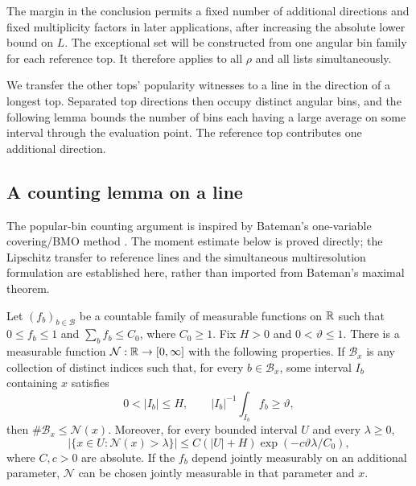 The margin in the conclusion permits a fixed number of additional
directions and fixed multiplicity factors in later applications, after
increasing the absolute lower bound on $L$.  The exceptional set will
be constructed from one angular bin family for each reference top.
It therefore applies to all $\rho$ and all lists simultaneously.

We transfer the other tops' popularity witnesses to a line in the direction
of a longest top.  Separated top directions then occupy distinct angular
bins, and the following lemma bounds the number of bins each having a
large average on some interval through the evaluation point.
The reference top contributes one additional direction.

\subsection{A counting lemma on a line}

The popular-bin counting argument is inspired by Bateman's one-variable
covering/BMO method \cite[Section~3.3.2, Lemmas~5--6]{Bateman2008Maximal}.
The moment estimate below is proved directly; the Lipschitz transfer to
reference lines and the simultaneous multiresolution formulation are
established here, rather than imported from Bateman's maximal theorem.

\begin{lemma}\label{count:line-lemma}
Let $(f_b)_{b\in\mathcal B}$ be a countable family of measurable
functions on $\mathbb R$ such that $0\leq f_b\leq1$ and
$\sum_b f_b\leq C_0$, where $C_0\geq1$.  Fix $H>0$ and
$0<\vartheta\leq1$.  There is a measurable function
$\mathcal N:\mathbb R\to[0,\infty]$ with the following properties.
If $\mathcal B_x$ is any collection of distinct indices such that,
for every $b\in\mathcal B_x$, some interval $I_b$ containing $x$
satisfies
\begin{equation}\label{count:line-average}
 0<|I_b|\leq H,\qquad |I_b|^{-1}\int_{I_b}f_b\geq\vartheta,
\end{equation}
then $\#\mathcal B_x\leq\mathcal N(x)$.  Moreover, for every bounded
interval $U$ and every $\lambda\geq0$,
\begin{equation}\label{count:line-tail}
 |\{x\in U:\mathcal N(x)>\lambda\}|
 \leq C(|U|+H)\exp(-c\vartheta\lambda/C_0),
\end{equation}
where $C,c>0$ are absolute.  If the $f_b$ depend jointly measurably
on an additional parameter, $\mathcal N$ can be chosen jointly
measurable in that parameter and $x$.
\end{lemma}

